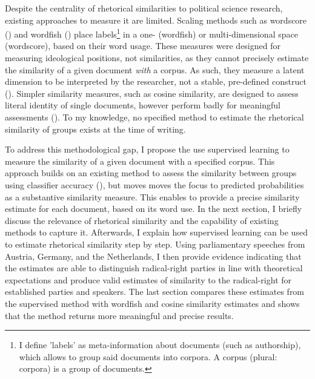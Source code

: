 \documentclass{article}
\begin{document}
Despite the centrality of rhetorical similarities to political science research, existing approaches to measure it are limited. Scaling methods such as wordscore (\cite{Laver2003}) and wordfish (\cite{Slapin2008}) place labels\footnote{I define 'labels' as meta-information about documents (such as authorship), which allows to group said documents into corpora. A corpus (plural: corpora) is a group of documents.} in a one- (wordfish) or multi-dimensional space (wordscore), based on their word usage. These measures were designed for measuring ideological positions, not similarities, as they cannot precisely estimate the similarity of a given document \textit{with} a corpus. As such, they measure a latent dimension to be interpreted by the researcher, not a stable, pre-defined construct (\cite{Goet2019}). Simpler similarity measures, such as cosine similarity, are designed to assess literal identity of single documents, however perform badly for meaningful assessments (\cite{Prasetya2018}). To my knowledge, no specified method to estimate the rhetorical similarity of groups exists at the time of writing.\par

To address this methodological gap, I propose the use supervised learning to measure the similarity of a given document with a specified corpus. This approach builds on an existing method to assess the similarity between groups using classifier accuracy (\cite{Peterson2018}), but moves moves the focus to predicted probabilities as a substantive similarity measure. This enables to provide a precise similarity estimate for each document, based on its word use. In the next section, I briefly discuss the relevance of rhetorical similarity and the capability of existing methods to capture it. Afterwards, I explain how supervised learning can be used to estimate rhetorical similarity step by step. Using parliamentary speeches from Austria, Germany, and the Netherlands, I then provide evidence indicating that the estimates are able to distinguish radical-right parties in line with theoretical expectations and produce valid estimates of similarity to the radical-right for established parties and speakers. The last section compares these estimates from the supervised method with wordfish and cosine similarity estimates and shows that the method returns more meaningful and precise results.\par

\end{document}
